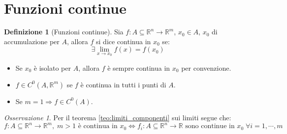 \documentclass[11pt, a4paper, openright]{book}
\theoremstyle{plain}
\theoremstyle{definition}
\newtheorem{definizione}[teorema]{Definizione}
\theoremstyle{remark}
\newtheorem{osservazione}[teorema]{Osservazione}
\begin{document}
\section{Funzioni continue}
\begin{definizione}[Funzioni continue]
    Sia $f: A \subseteq \mathbb{R}^n \longrightarrow \mathbb{R}^m$, $x_0 \in A$, $x_0$ di accumulazione per $A$, allora $f$ si dice continua in $x_0$ se:
    \begin{equation}
        \exists \lim_{x \to x_0} f(x) = f(x_0)
    \end{equation}
    \begin{itemize}
        \item Se $x_0$ è isolato per $A$, allora $f$ è sempre continua in $x_0$ per convenzione.
        \item $f \in C^0(A, \mathbb{R}^m)$ se $f$ è continua in tutti i punti di $A$.
        \item Se $m = 1 \Longrightarrow f \in C^0(A)$.
    \end{itemize}
\end{definizione}

\begin{osservazione}
    Per il teorema \ref{teo:limiti_componenti} sui limiti segue che:
    \begin{equation}
        f: A \subseteq \mathbb{R}^n \longrightarrow \mathbb{R}^m, \; m > 1 \text{ è continua in } x_0 \iff f_i: A \subseteq \mathbb{R}^n \longrightarrow \mathbb{R} \text{ sono continue in } x_0 \; \forall i = 1, \cdots, m
    \end{equation}
\end{osservazione}
\end{document}
